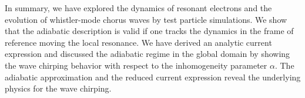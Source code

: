 In summary, we have explored the dynamics of resonant electrons and the evolution of whistler-mode chorus waves by test particle simulations.
We show that the adiabatic description is valid if one tracks the dynamics in the frame of reference moving the local resonance.
We have derived an analytic current expression and discussed the adiabatic regime in the global domain by showing the wave chirping behavior with respect to the inhomogeneity parameter $\alpha$.
The adiabatic approximation and the reduced current expression reveal the underlying physics for the wave chirping.